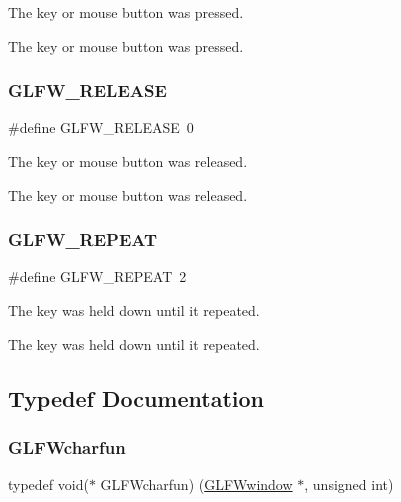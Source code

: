 The key or mouse button was pressed. 

The key or mouse button was pressed. \mbox{\label{group__input_gada11d965c4da13090ad336e030e4d11f}} 
\subsubsection{\texorpdfstring{G\+L\+F\+W\+\_\+\+R\+E\+L\+E\+A\+SE}{GLFW\_RELEASE}}
{\footnotesize\ttfamily \#define G\+L\+F\+W\+\_\+\+R\+E\+L\+E\+A\+SE~0}



The key or mouse button was released. 

The key or mouse button was released. \mbox{\label{group__input_gac96fd3b9fc66c6f0eebaf6532595338f}} 
\subsubsection{\texorpdfstring{G\+L\+F\+W\+\_\+\+R\+E\+P\+E\+AT}{GLFW\_REPEAT}}
{\footnotesize\ttfamily \#define G\+L\+F\+W\+\_\+\+R\+E\+P\+E\+AT~2}



The key was held down until it repeated. 

The key was held down until it repeated. 

\subsection{Typedef Documentation}
\mbox{\label{group__input_gabf24451c7ceb1952bc02b17a0d5c3e5f}} 
\subsubsection{\texorpdfstring{G\+L\+F\+Wcharfun}{GLFWcharfun}}
{\footnotesize\ttfamily typedef void($\ast$  G\+L\+F\+Wcharfun) (\hyperlink{group__window_ga3c96d80d363e67d13a41b5d1821f3242}{G\+L\+F\+Wwindow} $\ast$, unsigned int)}



